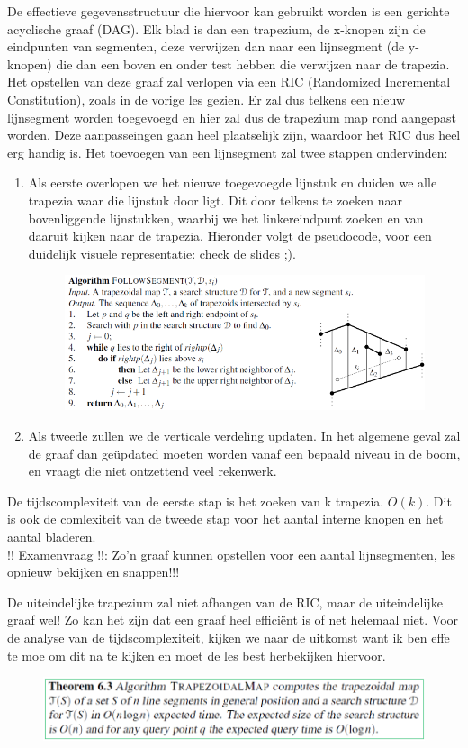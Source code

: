 \documentclass[12pt,a4paper]{article}
\begin{document}
	De effectieve gegevensstructuur die hiervoor kan gebruikt worden is een gerichte acyclische graaf (DAG). Elk blad is dan een trapezium, de x-knopen zijn de eindpunten van segmenten, deze verwijzen dan naar een lijnsegment (de y-knopen) die dan een boven en onder test hebben die verwijzen naar de trapezia. Het opstellen van deze graaf zal verlopen via een RIC (Randomized Incremental Constitution), zoals in de vorige les gezien. 
	Er zal dus telkens een nieuw lijnsegment worden toegevoegd en hier zal dus de trapezium map rond aangepast worden. Deze aanpasseingen gaan heel plaatselijk zijn, waardoor het RIC dus heel erg handig is. Het toevoegen van een lijnsegment zal twee stappen ondervinden:  
	\begin{enumerate}
		\item Als eerste overlopen we het nieuwe toegevoegde lijnstuk en duiden we alle trapezia waar die lijnstuk door ligt. Dit door telkens te zoeken naar bovenliggende lijnstukken, waarbij we het linkereindpunt zoeken en van daaruit kijken naar de trapezia. Hieronder volgt de pseudocode, voor een duidelijk visuele representatie: check de slides ;). 
		\begin{figure}[H]
			\centering
			\includegraphics[width=0.7\linewidth]{afbeeldingen/trapezium-map/stap1-lijnstukken}
			\label{fig:stap1-lijnstukken}
		\end{figure}
		
		\item Als tweede zullen we de verticale verdeling updaten. In het algemene geval zal de graaf dan geüpdated moeten worden vanaf een bepaald niveau in de boom, en vraagt die niet ontzettend veel rekenwerk. 
	\end{enumerate}
	De tijdscomplexiteit van de eerste stap is het zoeken van k trapezia. $O(k)$. Dit is ook de comlexiteit van de tweede stap voor het aantal interne knopen en het aantal bladeren. 
	\\
	!! Examenvraag !!: Zo'n graaf kunnen opstellen voor een aantal lijnsegmenten, les opnieuw bekijken en snappen!!!
	
	De uiteindelijke trapezium zal niet afhangen van de RIC, maar de uiteindelijke graaf wel! Zo kan het zijn dat een graaf heel efficiënt is of net helemaal niet. Voor de analyse van de tijdscomplexiteit, kijken we naar de uitkomst want ik ben effe te moe om dit na te kijken en moet de les best herbekijken hiervoor. 
	\begin{figure}[H]
		\centering
		\includegraphics[width=0.9\linewidth]{afbeeldingen/trapezium-map/theorem}
		\label{fig:theorem}
	\end{figure}
	
\end{document}
